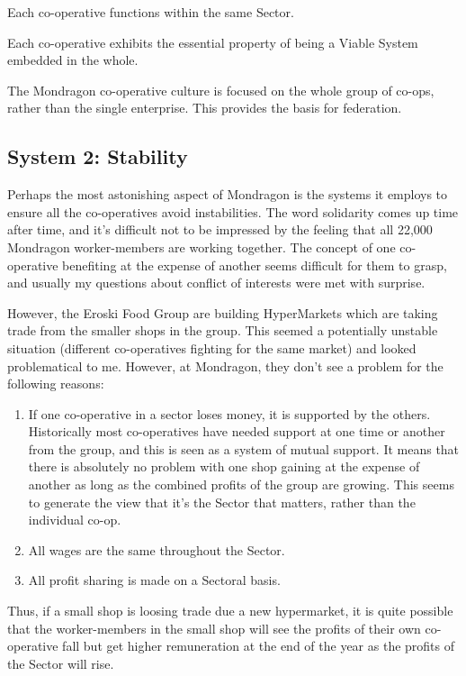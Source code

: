 Each co-operative functions within the same Sector.

Each co-operative exhibits the essential property of being a Viable System embedded in the whole.

The Mondragon co-operative culture is focused on the whole group of co-ops, rather than the single enterprise. This provides the basis for federation.

\subsection*{System 2: Stability}
Perhaps the most astonishing aspect of Mondragon is the systems it employs to ensure all the co-operatives avoid instabilities. The word solidarity comes up time after time, and it's difficult not to be impressed by the feeling that all 22,000 Mondragon worker-members are working together. The concept of one co-operative benefiting at the expense of another seems difficult for them to grasp, and usually my questions about conflict of interests were met with surprise.

However, the Eroski Food Group are building HyperMarkets which are taking trade from the smaller shops in the group. This seemed a potentially unstable situation (different co-operatives fighting for the same market) and looked problematical to me. However, at Mondragon, they don't see a problem for the following reasons:

\begin{enumerate}
  \item If one co-operative in a sector loses money, it is supported by the others. Historically most co-operatives have needed support at one time or another from the group, and this is seen as a system of mutual support. It means that there is absolutely no problem with one shop gaining at the expense of another as long as the combined profits of the group are growing. This seems to generate the view that it's the Sector that matters, rather than the individual co-op.

  \item All wages are the same throughout the Sector.

  \item All profit sharing is made on a Sectoral basis.

\end{enumerate}

Thus, if a small shop is loosing trade due a new hypermarket, it is quite possible that the worker-members in the small shop will see the profits of their own co-operative fall but get higher remuneration at the end of the year as the profits of the Sector will rise.

